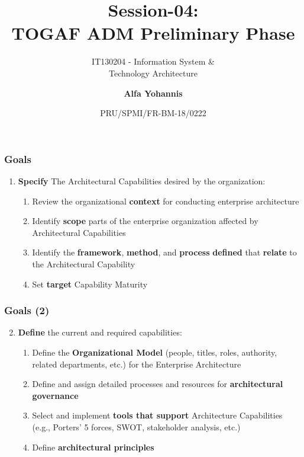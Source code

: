 \documentclass[aspectratio=169, table]{beamer}
\subtitle{IT130204 - Information System \&\\Technology Architecture}
\title{Session-04:\\\LARGE{TOGAF ADM Preliminary Phase\\}}
\date[Serial]{\scriptsize {PRU/SPMI/FR-BM-18/0222}}
\author[Pradita]{{\textbf{Alfa Yohannis}}}
\begin{document}
    \frame{\titlepage}



    \begin{frame}
        \frametitle{Goals}
        \begin{enumerate}
            \item \textbf{Specify} The Architectural Capabilities desired by the organization:
            \begin{enumerate}
                \item Review the organizational \textbf{context} for conducting enterprise architecture
                \item Identify \textbf{scope} parts of the enterprise organization affected by Architectural Capabilities
                \item Identify the \textbf{framework}, \textbf{method}, and \textbf{process} \textbf{defined} that \textbf{relate} to the Architectural Capability
                \item Set \textbf{target} Capability Maturity
            \end{enumerate}
        \end{enumerate}
    \end{frame}

    \begin{frame}
        \frametitle{Goals (2)}
        \begin{enumerate}
            \setcounter{enumi}{1}
            \item \textbf{Define} the current and required capabilities:
            \begin{enumerate}
                \item Define the \textbf{Organizational Model} (people, titles, roles, authority, related departments, etc.) for the Enterprise Architecture
                \item Define and assign detailed processes and resources for \textbf{architectural governance}
                \item Select and implement \textbf{tools that support} Architecture Capabilities (e.g., Porters' 5 forces, SWOT, stakeholder analysis, etc.)
                \item Define \textbf{architectural principles}
            \end{enumerate}
        \end{enumerate}
    \end{frame}
\end{document}
